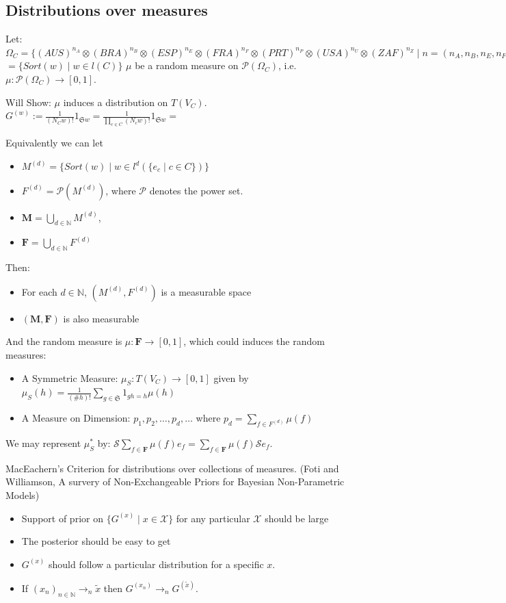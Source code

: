\documentclass{article}
\newcommand{\mathscr}{\mathcal}
\begin{document}
\subsection{Distributions over measures}
Let:
$\Omega_C = \{(AUS)^{n_A}\otimes(BRA)^{n_B}\otimes(ESP)^{n_E}\otimes(FRA)^{n_F}\otimes(PRT)^{n_P}\otimes(USA)^{n_U}\otimes(ZAF)^{n_Z} \mid n = (n_A,n_B,n_E,n_F,n_P,n_U,n_Z) \in \mathbb{N}^7 \}$ $ = \{Sort(w) \mid w \in l(C)\}$
$\mu$ be a random measure on $\mathcal{P}(\Omega_C)$, i.e. $\mu:\mathcal{P}(\Omega_C)\rightarrow[0,1]$. 

Will Show: $\mu$ induces a distribution on $T(V_C)$.
$G^{(w)} := \frac{1}{ (N_C w)!}1_{\mathfrak{S}w} = \frac{1}{ \prod_{c\in C}(N_{c}w)!}1_{\mathfrak{S}w} =$

Equivalently we can let 
\begin{itemize}
\item $M^{(d)} = \{Sort(w) \mid w \in l^d(\{e_c\mid c\in C\}) \} $
\item $F^{(d)} = \mathscr{P}(M^{(d)})$, where $\mathscr{P}$ denotes the power set.
\item $\mathbf{M} = \bigcup_{d\in\mathbb{N}}M^{(d)}$,
\item $\mathbf{F} = \bigcup_{d\in\mathbb{N}} F^{(d)}$
\end{itemize}
Then:
\begin{itemize}
\item For each $d\in\mathbb{N}$, $(M^{(d)},F^{(d)})$ is a measurable space
\item $(\mathbf{M},\mathbf{F})$ is also measurable
\end{itemize}

And the random measure is $\mu: \mathbf{F}\rightarrow [0,1]$, which could induces the random measures: 
\begin{itemize}
\item A Symmetric Measure: $\mu_S: T(V_C)\rightarrow[0,1]$ given by $ \mu_S(h) = \frac{1}{(\#h)!}\sum_{g\in\mathfrak{S}} 1_{gh=h}\mu(h)$
\item A Measure on Dimension: $p_1,p_2,\dots,p_d,\dots$ where $p_d = \sum_{f\in F^{(d)}}\mu(f)$
\end{itemize}

We may represent $\mu^*_S$ by: $\mathcal{S}\sum_{f\in\mathbf{F}}\mu(f)e_f =\sum_{f\in\mathbf{F}}\mu(f) \mathcal{S}e_f $.

MacEachern's Criterion for distributions over collections of measures. (Foti and Williamson, A survery of Non-Exchangeable Priors for Bayesian Non-Parametric Models)
\begin{itemize}
\item Support of prior on $\{G^{(x)} \mid x \in \mathcal{X}\}$ for any particular $\mathcal{X}$ should be large
\item The posterior should be easy to get
\item $G^{(x)}$ should follow a particular distribution for a specific $x$.
\item If $(x_n)_{n\in \mathbb{N}}\rightarrow_n \tilde{x}$ then $G^{(x_n)}\rightarrow_n G^{(\tilde{x})}$.
\end{itemize}
\end{document}
